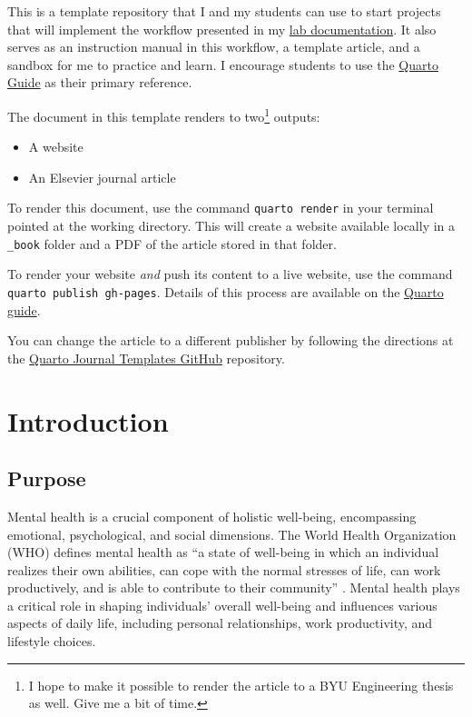 \documentclass[
  letterpaper,
  authoryear]{elsarticle}
\begin{document}
This is a template repository that I and my students can use to start
projects that will implement the workflow presented in my
\href{https://gregmacfarlane.github.io/lab/workflow.html}{lab
documentation}. It also serves as an instruction manual in this
workflow, a template article, and a sandbox for me to practice and
learn. I encourage students to use the
\href{https://quarto.org/docs/guide/}{Quarto Guide} as their primary
reference.

The document in this template renders to two\footnote{I hope to make it
  possible to render the article to a BYU Engineering thesis as well.
  Give me a bit of time.} outputs:

\begin{itemize}
\item
  A website
\item
  An Elsevier journal article
\end{itemize}

To render this document, use the command \texttt{quarto\ render} in your
terminal pointed at the working directory. This will create a website
available locally in a \texttt{\_book} folder and a PDF of the article
stored in that folder.

To render your website \emph{and} push its content to a live website,
use the command \texttt{quarto\ publish\ gh-pages}. Details of this
process are available on the
\href{https://quarto.org/docs/publishing/github-pages.html\#publish-command}{Quarto
guide}.

You can change the article to a different publisher by following the
directions at the \href{https://github.com/quarto-journals}{Quarto
Journal Templates GitHub} repository.


\hypertarget{introduction}{%
\section{Introduction}\label{introduction}}

\hypertarget{purpose}{%
\subsection{Purpose}\label{purpose}}

Mental health is a crucial component of holistic well-being,
encompassing emotional, psychological, and social dimensions. The World
Health Organization (WHO) defines mental health as ``a state of
well-being in which an individual realizes their own abilities, can cope
with the normal stresses of life, can work productively, and is able to
contribute to their community'' \citep{MentalHealthPAHO}. Mental health
plays a critical role in shaping individuals' overall well-being and
influences various aspects of daily life, including personal
relationships, work productivity, and lifestyle choices.
\end{document}
